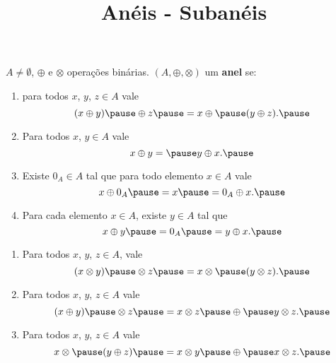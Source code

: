 \documentclass{beamer}
\title{An\'eis - Suban\'eis}
\author[\autor]{\autor}
\institute[\instituto]{\instituto}
\date{}
\begin{document}
    \begin{frame}
        \maketitle
    \end{frame}



    \begin{frame}
        \vspace{1cm}
        $A \ne \emptyset$, $\oplus$ \pause e $\otimes$ operações binárias. \pause $(A, \oplus, \otimes)$  um \textbf{anel} se:\pause
        \begin{enumerate}[label={\roman*})]
            \item \pause para todos $x$, \pause $y$, \pause $z \in A$ \pause vale\pause
            \[
                (x \oplus y) \pause \oplus z \pause = x \oplus \pause (y \oplus z).\pause
            \]

            \item \pause Para todos $x$, \pause $y \in A$ \pause vale\pause
            \[
                x \oplus y = \pause y \oplus x.\pause
            \]

            \item \pause Existe $0_A \in A$ \pause tal que para todo elemento $x \in A$ \pause vale\pause
            \[
                x \oplus 0_A \pause = x \pause = 0_A \oplus x.\pause
            \]

            \item \pause Para cada elemento $x \in A$, \pause existe $y \in A$ \pause tal que\pause
            \[
                x \oplus y \pause = 0_A \pause = y \oplus x.\pause
            \]

            \seti
    \end{enumerate}
    \end{frame}

    \begin{frame}
        \begin{enumerate}[label={\roman*})]
            \conti

            \item \pause Para todos $x$, \pause $y$, \pause $z \in A$, \pause vale\pause
            \[
                (x\otimes y) \pause \otimes z \pause = x \otimes \pause (y\otimes z).\pause
            \]

            \item Para todos $x$, \pause $y$, \pause $z \in A$ \pause vale\pause
            \[
                (x \oplus y) \pause \otimes z \pause = x \otimes z \pause \oplus \pause y\otimes z.\pause
            \]

            \item Para todos $x$, \pause $y$, \pause $z \in A$ \pause vale\pause
            \[
                x \otimes \pause (y \oplus z) \pause = x \otimes y \pause \oplus \pause x\otimes z.\pause
            \]
        \end{enumerate}
    \end{frame}
\end{document}
